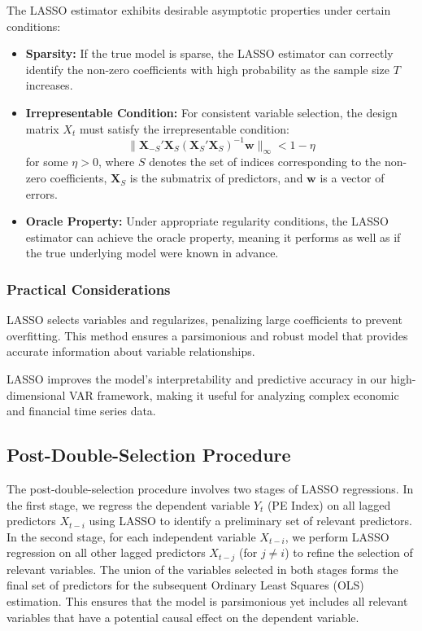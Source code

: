 \documentclass[12pt]{article}
\begin{document}
The LASSO estimator exhibits desirable asymptotic properties under certain conditions:
\begin{itemize}
    \item \textbf{Sparsity:} If the true model is sparse, the LASSO estimator can correctly identify the non-zero coefficients with high probability as the sample size \(T\) increases.
    \item \textbf{Irrepresentable Condition:} For consistent variable selection, the design matrix \(X_t\) must satisfy the irrepresentable condition:
    \[
    \|\mathbf{X}_{-S}' \mathbf{X}_S (\mathbf{X}_S' \mathbf{X}_S)^{-1} \mathbf{w}\|_\infty < 1 - \eta
    \]
    for some \(\eta > 0\), where \(S\) denotes the set of indices corresponding to the non-zero coefficients, \(\mathbf{X}_S\) is the submatrix of predictors, and \(\mathbf{w}\) is a vector of errors.
    \item \textbf{Oracle Property:} Under appropriate regularity conditions, the LASSO estimator can achieve the oracle property, meaning it performs as well as if the true underlying model were known in advance.
\end{itemize}

\subsubsection{Practical Considerations}

LASSO selects variables and regularizes, penalizing large coefficients to prevent overfitting. This method ensures a parsimonious and robust model that provides accurate information about variable relationships.

LASSO improves the model's interpretability and predictive accuracy in our high-dimensional VAR framework, making it useful for analyzing complex economic and financial time series data.


\subsection{Post-Double-Selection Procedure}


The post-double-selection procedure involves two stages of LASSO regressions. In the first stage, we regress the dependent variable \(Y_t\) (PE Index) on all lagged predictors \(X_{t-i}\) using LASSO to identify a preliminary set of relevant predictors. In the second stage, for each independent variable \(X_{t-i}\), we perform LASSO regression on all other lagged predictors \(X_{t-j}\) (for \(j \neq i\)) to refine the selection of relevant variables. The union of the variables selected in both stages forms the final set of predictors for the subsequent Ordinary Least Squares (OLS) estimation. This ensures that the model is parsimonious yet includes all relevant variables that have a potential causal effect on the dependent variable.
\end{document}
